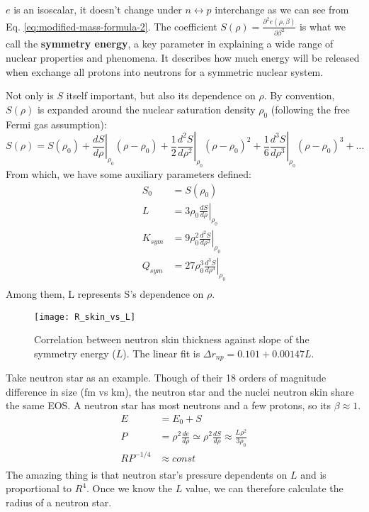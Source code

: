 $e$ is an isoscalar, it doesn't change under $n \leftrightarrow p$ interchange 
as we can see from Eq. \ref{eq:modified-mass-formula-2}. The coefficient 
$S(\rho) = \frac{\partial^2 e (\rho, \beta)}{\partial \beta^2}$ is
what we call the \textbf{symmetry energy}, a key parameter in explaining a wide
range of nuclear properties and phenomena. It describes how much energy will be
released when exchange all protons into neutrons for a symmetric nuclear system. 

Not only is $S$ itself important, but also its dependence on $\rho$. 
By convention, $S(\rho)$ is expanded around the nuclear saturation density $\rho_0$
(following the free Fermi gas assumption):
\begin{equation}
    S(\rho) = S(\rho_0) 
    + \left.\frac{dS}{d\rho}\right|_{\rho_0}(\rho - \rho_0)
    + \frac{1}{2}\left.\frac{d^2S}{d\rho^2}\right|_{\rho_0}(\rho - \rho_0)^2
    + \frac{1}{6}\left.\frac{d^3S}{d\rho^3}\right|_{\rho_0}(\rho - \rho_0)^3
    + \dots
\end{equation}
From which, we have some auxiliary parameters defined:
\begin{equation}
    \begin{aligned}
	S_0 &= S(\rho_0)	\\
	L   &= 3\rho_0\left.\frac{dS}{d\rho}\right|_{\rho_0}	\\
	K_{sym}	&= 9\rho_0^2\left.\frac{d^2S}{d\rho^2}\right|_{\rho_0}	\\
	Q_{sym}	&= 27\rho_0^3\left.\frac{d^3S}{d\rho^3}\right|_{\rho_0}	\\
    \end{aligned}
\end{equation}
Among them, L represents S's dependence on $\rho$.
\begin{figure}[H]
    \centering
    \texttt{[image: R\_skin\_vs\_L]}
    \caption{Correlation between \Pb neutron skin thickness against slope of the
    symmetry energy ($L$). The linear fit is $\Delta r_{np} = 0.101 + 0.00147 L$.
    \cite{PhysRevLett.106.252501}}
\end{figure}

Take neutron star \cite{Lattimer.2001} as an example. Though of their 18 orders of
magnitude difference in size (fm vs km), the neutron star and the nuclei
neutron skin share the same EOS. A neutron star has most neutrons and  
a few protons, so its $\beta \approx 1$.
\begin{equation}
    \begin{aligned}
	E &= E_0 + S	\\
	 P &= \rho^2\frac{de}{d\rho} \simeq \rho^2 \frac{dS}{d\rho} \approx \frac{L\rho^2}{3\rho_0}  \\
	 RP^{-1/4} &\approx const    \\
    \end{aligned}
    \label{eq:neutron-star}
\end{equation}
The amazing thing is that neutron star's pressure dependents on $L$ and is proportional 
to $R^4$. Once we know the $L$ value, we can therefore calculate the radius of a neutron star. 

